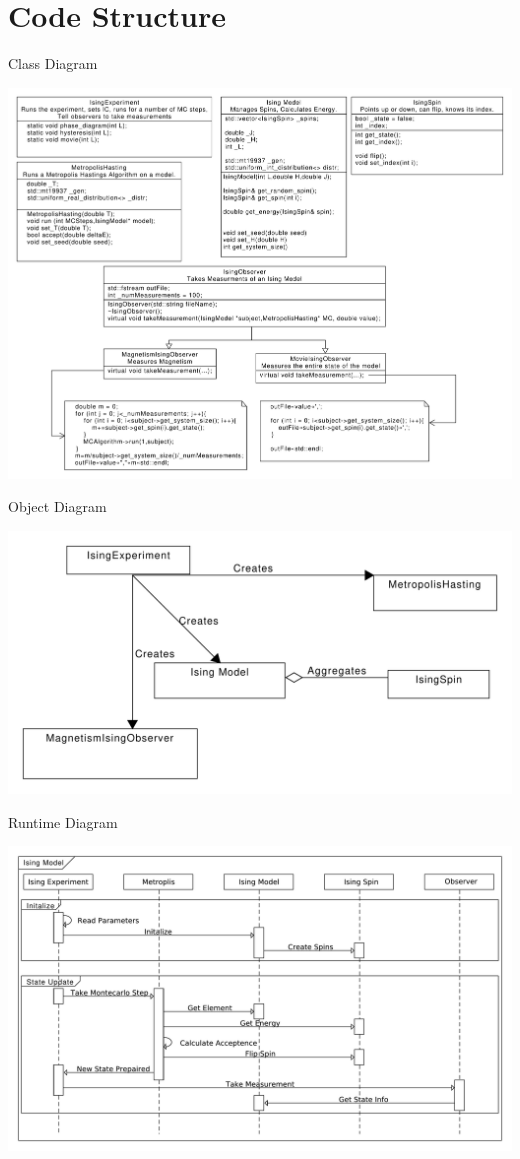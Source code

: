 \documentclass[]{scrartcl}
\begin{document}
\section{Code Structure}
Class Diagram
\begin{center}
	\includegraphics[width=\linewidth]{"Ising Classes"}
\end{center}
\pagebreak
Object Diagram
\begin{center}
	\includegraphics[width=\linewidth]{"Ising Objects"}
\end{center}
Runtime Diagram
\begin{center}
	\includegraphics[width=\linewidth]{"Ising Runtime"}
\end{center}
\end{document}
